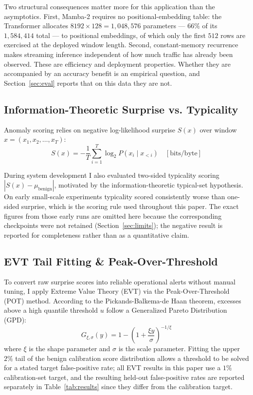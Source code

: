 \documentclass[10pt,journal,compsoc]{IEEEtran}
\begin{document}
Two structural consequences matter more for this application than the asymptotics. First, Mamba-2 requires no positional-embedding table: the Transformer allocates $8192 \times 128 = 1{,}048{,}576$ parameters --- $66\%$ of its $1{,}584{,}414$ total --- to positional embeddings, of which only the first $512$ rows are exercised at the deployed window length. Second, constant-memory recurrence makes streaming inference independent of how much traffic has already been observed. These are efficiency and deployment properties. Whether they are accompanied by an accuracy benefit is an empirical question, and Section~\ref{sec:eval} reports that on this data they are not.

\subsection{Information-Theoretic Surprise vs. Typicality}
Anomaly scoring relies on negative log-likelihood surprise $S(x)$ over window $x = (x_1, x_2, \dots, x_T)$:
\begin{equation}
    S(x) = -\frac{1}{T} \sum_{i=1}^{T} \log_2 P(x_i \mid x_{<i}) \quad [\text{bits/byte}]
\end{equation}

During system development I also evaluated two-sided typicality scoring $|S(x) - \mu_{\text{benign}}|$, motivated by the information-theoretic typical-set hypothesis. On early small-scale experiments typicality scored consistently worse than one-sided surprise, which is the scoring rule used throughout this paper. The exact figures from those early runs are omitted here because the corresponding checkpoints were not retained (Section~\ref{sec:limits}); the negative result is reported for completeness rather than as a quantitative claim.

\subsection{EVT Tail Fitting \& Peak-Over-Threshold}
To convert raw surprise scores into reliable operational alerts without manual tuning, I apply Extreme Value Theory (EVT) via the Peak-Over-Threshold (POT) method. According to the Pickands-Balkema-de Haan theorem, excesses above a high quantile threshold $u$ follow a Generalized Pareto Distribution (GPD):
\begin{equation}
    G_{\xi, \sigma}(y) = 1 - \left( 1 + \frac{\xi y}{\sigma} \right)^{-1/\xi}
\end{equation}
where $\xi$ is the shape parameter and $\sigma$ is the scale parameter. Fitting the upper $2\%$ tail of the benign calibration score distribution allows a threshold to be solved for a stated target false-positive rate; all EVT results in this paper use a $1\%$ calibration-set target, and the resulting held-out false-positive rates are reported separately in Table~\ref{tab:results} since they differ from the calibration target.
\end{document}
